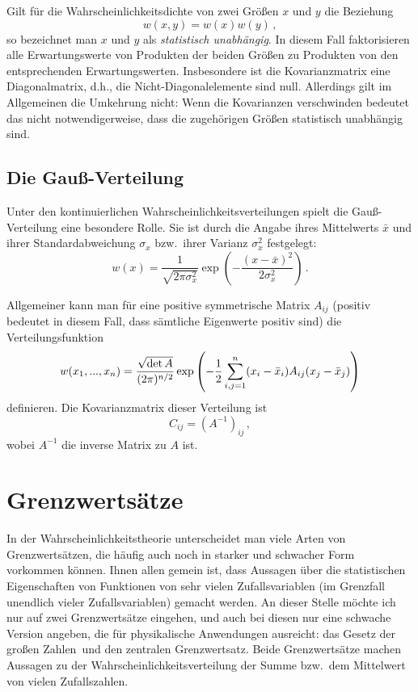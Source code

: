 Gilt f\"ur die Wahrscheinlichkeitsdichte von zwei Gr\"o\ss en 
$x$ und $y$ die Beziehung
\begin{equation}
     w(x,y) = w(x) w(y) \, ,
\end{equation}
so bezeichnet man $x$ und $y$ als {\em statistisch unabh\"angig}.
In diesem Fall faktorisieren alle Erwartungswerte
von Produkten der beiden Gr\"o\ss en zu Produkten
von den entsprechenden Erwartungswerten. Insbesondere
ist die Kovarianzmatrix eine Diagonalmatrix, d.h., die
Nicht-Diagonalelemente sind null. Allerdings gilt im
Allgemeinen die Umkehrung nicht: Wenn die Kovarianzen
verschwinden bedeutet das nicht notwendigerweise, dass
die zugeh\"origen Gr\"o\ss en statistisch unabh\"angig sind.

\subsection{Die Gau\ss-Verteilung}

Unter den kontinuierlichen Wahrscheinlichkeitsverteilungen
spielt die Gau\ss-Verteilung eine besondere Rolle.
Sie ist durch die Angabe ihres Mittelwerts $\bar{x}$ und
ihrer Standardabweichung $\sigma_x$ bzw.\ ihrer
Varianz $\sigma_x^2$ festgelegt:
\begin{equation}
     w(x) = \frac{1}{\sqrt{2\pi \sigma_x^2}} \exp \left( 
     - \frac{(x-\bar{x})^2}{2 \sigma_x^2} \right) \, .
\end{equation}

Allgemeiner kann man f\"ur eine positive
symmetrische Matrix $A_{ij}$ (positiv bedeutet in diesem
Fall, dass s\"amtliche Eigenwerte positiv sind) die
Verteilungsfunktion 
\begin{equation}
     w(x_1,...,x_n) = \frac{\sqrt{{\rm det}\,A}}{(2\pi)^{n/2}} \exp \left( 
     - \frac{1}{2} \sum_{i,j=1}^n (x_i-\bar{x}_i) A_{ij} (x_j -\bar{x}_j) \right) 
\end{equation}
definieren. Die Kovarianzmatrix dieser Verteilung ist
\begin{equation}
          C_{ij} = (A^{-1})_{ij} \, ,
\end{equation}
wobei $A^{-1}$ die 
inverse Matrix zu $A$ ist. 

\section{Grenzwerts\"atze}

In der Wahrscheinlichkeitstheorie unterscheidet man viele 
Arten von Grenzwerts\"atzen, die h\"aufig auch noch 
in starker und schwacher Form vorkommen 
k\"onnen. Ihnen allen gemein ist, dass Aussagen
\"uber die statistischen Eigenschaften von Funktionen von 
sehr vielen Zufallsvariablen (im Grenzfall unendlich
vieler Zufallsvariablen) gemacht werden. An dieser
Stelle m\"ochte ich nur auf zwei Grenzwerts\"atze eingehen,
und auch bei diesen nur eine schwache Version
angeben, die f\"ur physikalische Anwendungen 
ausreicht: das \glqq Gesetz der gro\ss en Zahlen\grqq\
und den \glqq zentralen Grenzwertsatz\grqq.  Beide
Grenzwerts\"atze machen Aussagen zu der
Wahrscheinlichkeitsverteilung der Summe bzw.\ dem
Mittelwert von vielen Zufallszahlen. 

